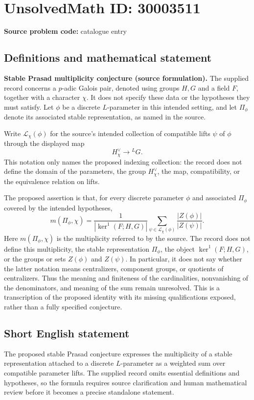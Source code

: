\documentclass[11pt]{article}
\begin{document}
\section*{UnsolvedMath ID: 30003511}
\textbf{Source problem code:} catalogue entry
\subsection{Definitions and mathematical statement}
\textbf{Stable Prasad multiplicity conjecture (source formulation).}
The supplied record concerns a \(p\)-adic Galois pair, denoted using groups \(H,G\) and a field \(F\), together with a character \(\chi\). It does not specify these data or the hypotheses they must satisfy. Let \(\phi\) be a discrete \(L\)-parameter in this intended setting, and let \(\Pi_\phi\) denote its associated stable representation, as named in the source.

Write \(\mathcal L_\chi(\phi)\) for the source's intended collection of compatible lifts \(\psi\) of \(\phi\) through the displayed map
\[
H^\vee_\chi\longrightarrow{}^LG.
\]
This notation only names the proposed indexing collection: the record does not define the domain of the parameters, the group \(H^\vee_\chi\), the map, compatibility, or the equivalence relation on lifts.

The proposed assertion is that, for every discrete parameter \(\phi\) and associated \(\Pi_\phi\) covered by the intended hypotheses,
\[
m(\Pi_\phi,\chi)
=
\frac{1}{\left|\ker^1(F;H,G)\right|}
\sum_{\psi\in\mathcal L_\chi(\phi)}
\frac{|Z(\phi)|}{|Z(\psi)|}.
\]
Here \(m(\Pi_\phi,\chi)\) is the multiplicity referred to by the source. The record does not define this multiplicity, the stable representation \(\Pi_\phi\), the object \(\ker^1(F;H,G)\), or the groups or sets \(Z(\phi)\) and \(Z(\psi)\). In particular, it does not say whether the latter notation means centralizers, component groups, or quotients of centralizers. Thus the meaning and finiteness of the cardinalities, nonvanishing of the denominators, and meaning of the sum remain unresolved. This is a transcription of the proposed identity with its missing qualifications exposed, rather than a fully specified conjecture.
\subsection{Short English statement}
The proposed stable Prasad conjecture expresses the multiplicity of a stable representation attached to a discrete \(L\)-parameter as a weighted sum over compatible parameter lifts. The supplied record omits essential definitions and hypotheses, so the formula requires source clarification and human mathematical review before it becomes a precise standalone statement.
\end{document}
